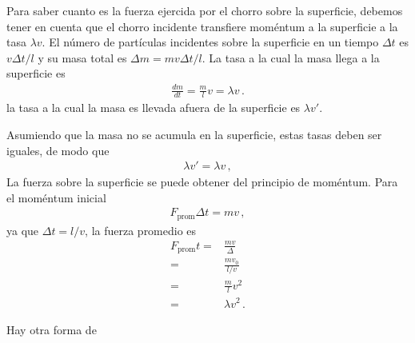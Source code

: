 \begin{borrar}
  
Para saber cuanto es la fuerza ejercida por el chorro
sobre la superficie, debemos tener en cuenta que el chorro incidente
transfiere moméntum a la superficie a la tasa $\lambda v$. El número
de partículas incidentes sobre la superficie en un tiempo $\Delta t$ es
$v\Delta t/l$ y su masa total es $\Delta m=m v\Delta t/l$. La tasa a
la cual la masa llega a la superficie es
\begin{align*}
  \frac{dm}{dt}=\frac{m}{l}v=\lambda v\,.
\end{align*}
la tasa a la cual la masa es llevada afuera de la superficie es
$\lambda v'$. 

Asumiendo que la masa no se acumula en la superficie, estas tasas
deben ser iguales, de modo que
\begin{align*}
  \lambda v'=\lambda v\,,
\end{align*}
La fuerza sobre la superficie se puede obtener del principio de moméntum. Para el moméntum inicial
\begin{align*}
  F_{\text{prom}}\Delta t =m v\,,
\end{align*}
ya que $\Delta t=l/v$, la fuerza promedio es
\begin{align*}
  F_{\text{prom}} t =&\frac{m v}{\Delta}\nonumber\\
=&\frac{m v_0}{l/v}\nonumber\\
=&\frac{m}{l} v^2\nonumber\\
=& \lambda v^2\,.
\end{align*}

Hay otra forma de 
\end{borrar}


\begin{extrapage}
  \newpage
  \qquad
  \newpage
\end{extrapage}


